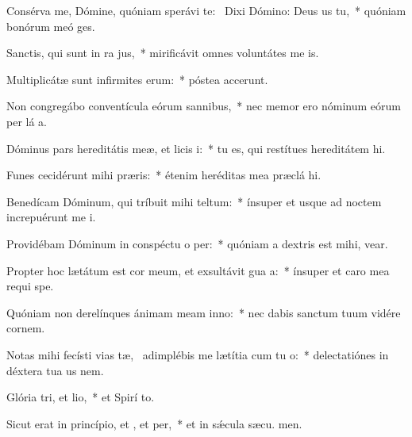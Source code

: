 \item Consérva me, Dómine, quóniam sperávi  te:~\pscross{} Dixi Dómino: Deus us  tu,~* quóniam bonórum meó  ges.
\item Sanctis, qui sunt in ra jus,~* mirificávit omnes voluntátes me  is.
\item Multiplicátæ sunt infirmites erum:~* póstea accerunt.
\item Non congregábo conventícula eórum  sannibus,~* nec memor ero nóminum eórum per lá a.
\item Dóminus pars hereditátis meæ, et licis i:~* tu es, qui restítues hereditátem  hi.
\item Funes cecidérunt mihi  præris:~* étenim heréditas mea præclá  hi.
\item Benedícam Dóminum, qui tríbuit mihi teltum:~* ínsuper et usque ad noctem increpuérunt me  i.
\item Providébam Dóminum in conspéctu o per:~* quóniam a dextris est mihi,  vear.
\item Propter hoc lætátum est cor meum, et exsultávit gua a:~* ínsuper et caro mea requi  spe.
\item Quóniam non derelínques ánimam meam  inno:~* nec dabis sanctum tuum vidére cornem.
\item Notas mihi fecísti vias tæ,~\pscross{} adimplébis me lætítia cum tu o:~* delectatiónes in déxtera tua us  nem.
\item Glória tri, et lio,~* et Spirí to.
\item Sicut erat in princípio, et , et per,~* et in sǽcula sæcu. men.
